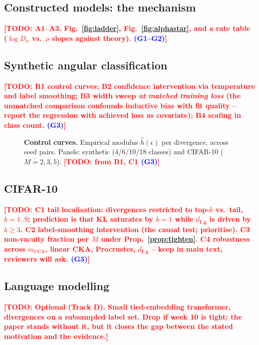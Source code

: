 \documentclass{article}
\newcommand{\TODO}[1]{\textcolor{red}{\textbf{[TODO: #1]}}}
\newcommand{\GATE}[1]{\textcolor{blue}{\textsf{\small (#1)}}}
\newcommand{\bff}{\mathbf{f}}
\newcommand{\bfg}{\mathbf{g}}
\newcommand{\dfg}{d_{\bff,\bfg}}
\newcommand{\Dalpha}{D_{\alpha}}
\theoremstyle{plain}
\theoremstyle{definition}
\theoremstyle{remark}
\begin{document}
\subsection{Constructed models: the mechanism}
\label{sec:exp-constructed}
\TODO{A1--A3. Fig.~\ref{fig:ladder}, Fig.~\ref{fig:alphastar}, and a rate table
($\log\Dalpha$ vs.\ $\rho$ slopes against theory). \GATE{G1--G2}}

\subsection{Synthetic angular classification}
\label{sec:exp-synthetic}
\TODO{B1 control curves; B2 confidence intervention via temperature and label
smoothing; B3 width sweep \emph{at matched training loss} (the unmatched
comparison confounds inductive bias with fit quality -- report the regression
with achieved loss as covariate); B4 scaling in class count. \GATE{G3}}

\begin{figure}[t]
\centering
\caption{\textbf{Control curves.} Empirical modulus $\hat h(\epsilon)$ per
divergence, across seed pairs. Panels: synthetic (4/6/10/18 classes) and
CIFAR-10 ($M=2,3,5$). \TODO{from B1, C1 \GATE{G3}}}
\label{fig:control}
\end{figure}

\subsection{CIFAR-10}
\label{sec:exp-cifar}
\TODO{C1 tail localisation: divergences restricted to top-$k$ vs.\ tail,
$k=1..9$; prediction is that KL saturates by $k=1$ while $\dfg$ is driven by
$k\ge3$. C2 label-smoothing intervention (the causal test; prioritise). C3
non-vacuity fraction per $M$ under Prop.~\ref{prop:tighten}. C4 robustness
across $m_{\mathrm{CCA}}$, linear CKA, Procrustes, $\dfg$ -- keep in main text,
reviewers will ask. \GATE{G3}}

\subsection{Language modelling}
\label{sec:exp-lm}
\TODO{Optional (Track D). Small tied-embedding transformer, divergences on a
subsampled label set. Drop if week 10 is tight; the paper stands without it,
but it closes the gap between the stated motivation and the evidence.}

\end{document}
